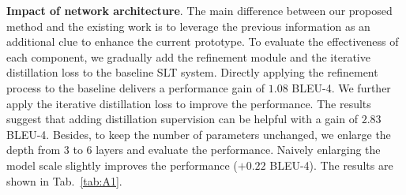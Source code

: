 \documentclass[10pt,twocolumn,letterpaper]{article}
\begin{document}
     

     
     
    \smallskip
    \noindent \textbf{Impact of network architecture}.
    The main difference between our proposed method and the existing work is to leverage the previous information as an additional clue to enhance the current prototype. To evaluate the effectiveness of each component, we gradually add the refinement module and the iterative distillation loss to the baseline SLT system. Directly applying the refinement process to the baseline delivers a performance gain of $1.08$ BLEU-4. 
    We further apply the iterative distillation loss to improve the performance. The results suggest that adding distillation supervision can be helpful with a gain of $2.83$ BLEU-4. 
    Besides, to keep the number of parameters unchanged, we enlarge the depth from $3$ to $6$ layers and evaluate the performance. 
    Naively enlarging the model scale slightly improves the performance ($+0.22$ BLEU-4).
    The results are shown in Tab.~\ref{tab:A1}. 

     \setlength{\tabcolsep}{5.5pt}
    \begin{table}[!t]
     \scriptsize
     \vspace{0.5mm}
     \caption{The weight $\lambda$ of iterative distillation loss to CE loss.}
     \label{tab:A4}
     \vspace{-1mm}
     \end{table}

    
     

     
\end{document}
